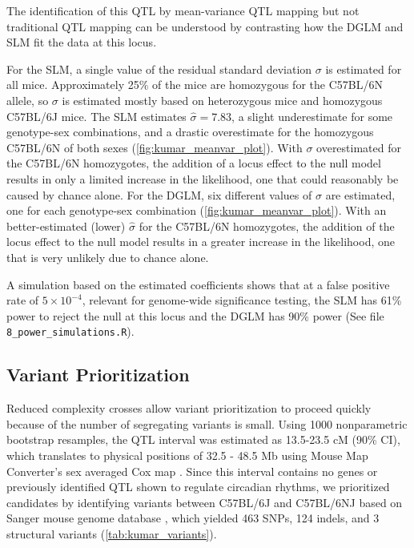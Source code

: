     The identification of this QTL by mean-variance QTL mapping but not traditional QTL mapping can be understood by contrasting how the DGLM and SLM fit the data at this locus.

    For the SLM, a single value of the residual standard deviation $\sigma$ is estimated for all mice.
    Approximately 25\% of the mice are homozygous for the C57BL/6N allele, so $\sigma$ is estimated mostly based on heterozygous mice and homozygous C57BL/6J mice.
    The SLM estimates $\hat{\sigma}=7.83$, a slight underestimate for some genotype-sex combinations, and a drastic overestimate for the homozygous C57BL/6N of both sexes (\autoref{fig:kumar_meanvar_plot}).
    With $\sigma$ overestimated for the C57BL/6N homozygotes, the addition of a locus effect to the null model results in only a limited increase in the likelihood, one that could reasonably be caused by chance alone.
    For the DGLM, six different values of $\sigma$ are estimated, one for each genotype-sex combination (\autoref{fig:kumar_meanvar_plot}).
    With an better-estimated (lower) $\widehat{\sigma}$ for the C57BL/6N homozygotes, the addition of the locus effect to the null model results in a greater increase in the likelihood, one that is very unlikely due to chance alone.

    A simulation based on the estimated coefficients shows that at a false positive rate of $5 \times 10^{-4}$, relevant for genome-wide significance testing, the SLM has 61\% power to reject the null at this locus and the DGLM has 90\% power (See file \texttt{8\_power\_simulations.R}).

    \subsection{Variant Prioritization}
    Reduced complexity crosses allow variant prioritization to proceed quickly because of the number of segregating variants is small.
    Using 1000 nonparametric bootstrap resamples, the QTL interval was estimated as 13.5-23.5 cM (90\% CI), which translates to physical positions of 32.5 - 48.5 Mb using Mouse Map Converter's sex averaged Cox map \citep{Cox2009}.
    Since this interval contains no genes or previously identified QTL shown to regulate circadian rhythms, we prioritized candidates by identifying variants between C57BL/6J and C57BL/6NJ based on Sanger mouse genome database \citep{Keane2011a,Simon2013}, which yielded 463 SNPs, 124 indels, and 3 structural variants (\autoref{tab:kumar_variants}).
    
